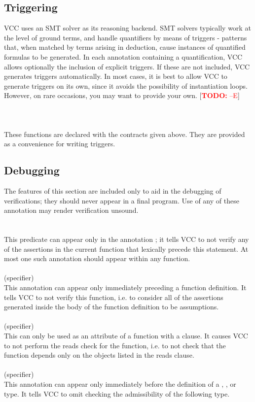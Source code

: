 \documentclass[preprint,nocopyrightspace]{sigplanconf}
\newcommand{\todo}[1]{[\textcolor{red}{\textbf{TODO:} {#1}}]}
\begin{document}
{{\subsection{Triggering}
VCC uses an SMT solver as its reasoning backend. SMT solvers typically
work at the level of ground terms, and handle quantifiers by means of
triggers - patterns that, when matched by terms arising in deduction,
cause instances of quantified formulas to be generated. In each
annotation containing a quantification, VCC allows optionally the
inclusion of explicit triggers. If these are not included, VCC
generates triggers automatically. In most cases, it is best to allow
VCC to generate triggers on its own, since it avoids the possibility
of instantiation loops. However, on rare occasions, you may want to
provide your own. \todo{--E}
\\\\
\\
\\
These functions are declared with the contracts given above. They are provided as a
convenience for writing triggers. 

\subsection{Debugging}
The features of this section are included only to aid in the debugging
of verifications; they should never appear in a final program. Use of
any of these annotation may render verification unsound.
\\\\
\\
This predicate can appear only in the
annotation ; it tells VCC to not verify
any of the assertions in the current function that lexically precede
this statement. At most one such annotation should appear within any
function. 
\\\\
 (specifier)\\
This annotation can appear only immediately preceding a function
definition. It tells VCC to not verify this function, i.e. to consider
all of the assertions generated inside the body of the function
definition to be assumptions.
\\\\
 (specifier)\\
This  can only be used as an attribute of a  function
with a  clause. It causes VCC to not perform the reads
check for the function, i.e. to not check that the function depends
only on the objects listed in the reads clause.
\\\\
 (specifier)\\
This annotation can appear only immediately before the definition of
a , , or  type. It tells VCC to
omit checking the admissibility of the following type.

}}
\end{document}
